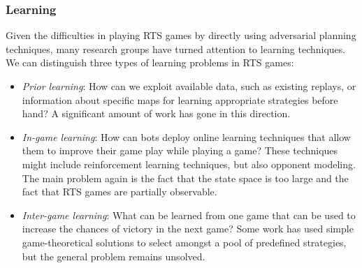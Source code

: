 \documentclass[journal]{IEEEtran}
\begin{document}
\subsubsection{Learning}
Given the difficulties in playing RTS games by directly using adversarial planning techniques, many research groups have turned attention to learning techniques. We can distinguish three types of learning problems in RTS games:
\begin{itemize}
\item {\em Prior learning}: How can we exploit available data, such as existing replays, or information about specific maps for learning appropriate strategies before hand? A significant amount of work has gone in this direction.%
\item {\em In-game learning}: How can bots deploy online learning techniques that allow them to improve their game play while playing a game? These techniques might include reinforcement learning techniques, but also opponent modeling. The main problem again is the fact that the state space is too large and the fact that RTS games are partially observable.
\item {\em Inter-game learning}: What can be learned from one game that can be used to increase the chances of victory in the next game? Some work has used simple game-theoretical solutions to select amongst a pool of predefined strategies, but the general problem remains unsolved.
\end{itemize}

\end{document}
